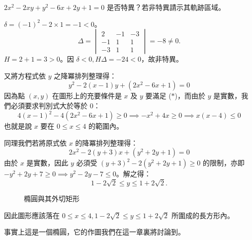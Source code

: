 \begin{example}
$2x^2 - 2xy + y^2 - 6x + 2y + 1 = 0$ 是否特異？若非特異請示其軌跡區域。
\end{example}

\begin{solution}
$\delta = (-1)^2 - 2 \times 1 = -1 < 0$。
\[
\Delta = \begin{vmatrix} 2 & -1 & -3 \\ -1 & 1 & 1 \\ -3 & 1 & 1 \end{vmatrix} = -8 \ne 0.
\]
$H = 2 + 1 = 3 > 0$。因 $\delta < 0, H\Delta = -24 < 0$，故非特異。

又將方程式依 $y$ 之降冪排列整理得：
\[
y^2 - 2(x - 1)y + (2x^2 - 6x + 1) = 0 \tag{$*$}
\]
因為點 $(x, y)$ 在圖形上的充要條件是 $x$ 及 $y$ 要滿足 ($*$)，而由於 $y$ 是實數，我們必須要求判別式大於等於 0：
\[
4(x - 1)^2 - 4(2x^2 - 6x + 1) \ge 0 \implies -x^2 + 4x \ge 0 \implies x(x - 4) \le 0
\]
也就是說 $x$ 要在 $0 \le x \le 4$ 的範圍內。

同理我們若將原式依 $x$ 的降冪排列整理得：
\[
2x^2 - 2(y + 3)x + (y^2 + 2y + 1) = 0
\]
由於 $x$ 是實數，因此 $y$ 必須受 $(y + 3)^2 - 2(y^2 + 2y + 1) \ge 0$ 的限制，亦即 $-y^2 + 2y + 7 \ge 0 \implies y^2 - 2y - 7 \le 0$。解之得：
\[
1 - 2\sqrt{2} \le y \le 1 + 2\sqrt{2}.
\]

\begin{figure}[htbp]
\centering
{}
\caption{橢圓與其外切矩形}
\label{fig:b4s-ch4-fig1-6}
\end{figure}

因此圖形應該落在 $0 \le x \le 4, 1 - 2\sqrt{2} \le y \le 1 + 2\sqrt{2}$ 所圍成的長方形內。

事實上這是一個橢圓，它的作圖我們在這一章裏將討論到。
\end{solution}

